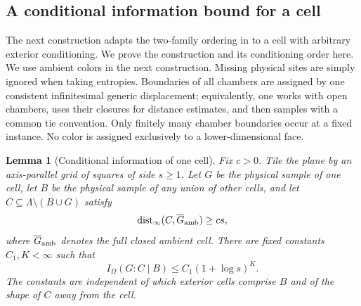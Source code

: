 \documentclass[11pt]{article}
\numberwithin{equation}{section}
\newtheorem{lemma}[theorem]{Lemma}
\theoremstyle{definition}
\theoremstyle{remark}
\begin{document}
\subsection{A conditional information bound for a cell}

The next construction adapts the two-family ordering in
\cite[Section~11]{RepoAreaLaw} to a cell with arbitrary exterior conditioning.
We prove the construction and its conditioning order here.
We use ambient colors in the next construction.  Missing physical sites
are simply ignored when taking entropies.  Boundaries of all chambers
are assigned by one consistent infinitesimal generic displacement;
equivalently, one works with open chambers, uses their closures for
distance estimates, and then samples with a common tie convention.
Only finitely many chamber boundaries occur at a fixed instance.  No
color is assigned exclusively to a lower-dimensional face.

\begin{lemma}[Conditional information of one cell]
\label{lem:cell-cmi}
Fix $c>0$.  Tile the plane by an axis-parallel grid of squares of side
$s\ge1$.  Let $G$ be the physical sample of one cell, let $B$ be the
physical sample of any union of other cells, and let
$C\subseteq\Lambda\setminus(B\cup G)$ satisfy
\[
 \operatorname{dist}_\infty(C,\overline{G}_{\rm amb})\ge cs,
\]
where $\overline{G}_{\rm amb}$ denotes the full closed ambient cell.
There are fixed constants $C_1,K<\infty$ such that
\begin{equation}
 I_\Omega(G:C\mid B)\le C_1(1+\log s)^K.
 \label{eq:info-cell-cmi}
\end{equation}
The constants are independent of which exterior cells comprise $B$
and of the shape of $C$ away from the cell.
\end{lemma}
\end{document}
